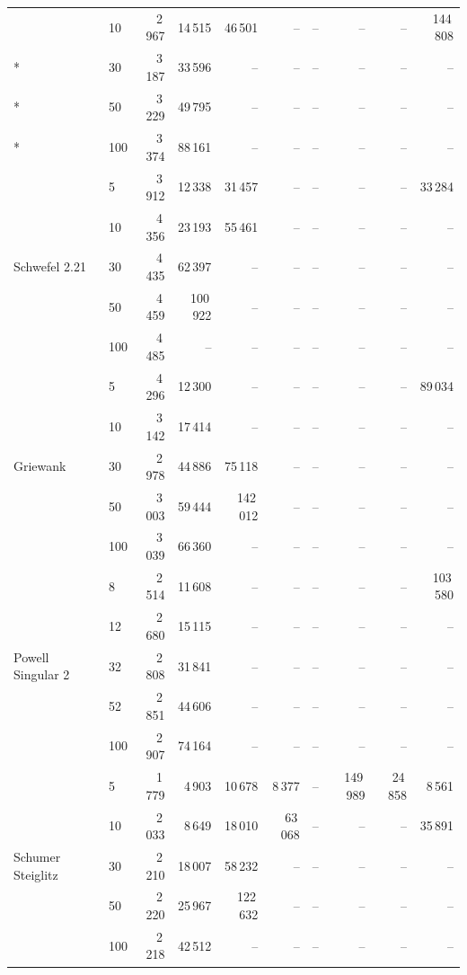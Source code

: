 {\begin{longtable}{llrrrrrrrr}
 & 10 & 2\,967 & 14\,515 & 46\,501 & -- & -- & -- & -- & 144\,808 \\*
 & 30 & 3\,187 & 33\,596 & -- & -- & -- & -- & -- & -- \\*
 & 50 & 3\,229 & 49\,795 & -- & -- & -- & -- & -- & -- \\*
 & 100 & 3\,374 & 88\,161 & -- & -- & -- & -- & -- & -- \\
\midrule
\multirow{5}{*}{Schwefel 2.21} & 5 & 3\,912 & 12\,338 & 31\,457 & -- & -- & -- & -- & 33\,284 \\*
 & 10 & 4\,356 & 23\,193 & 55\,461 & -- & -- & -- & -- & -- \\*
 & 30 & 4\,435 & 62\,397 & -- & -- & -- & -- & -- & -- \\*
 & 50 & 4\,459 & 100\,922 & -- & -- & -- & -- & -- & -- \\*
 & 100 & 4\,485 & -- & -- & -- & -- & -- & -- & -- \\
\midrule
\multirow{5}{*}{Griewank} & 5 & 4\,296 & 12\,300 & -- & -- & -- & -- & -- & 89\,034 \\*
 & 10 & 3\,142 & 17\,414 & -- & -- & -- & -- & -- & -- \\*
 & 30 & 2\,978 & 44\,886 & 75\,118 & -- & -- & -- & -- & -- \\*
 & 50 & 3\,003 & 59\,444 & 142\,012 & -- & -- & -- & -- & -- \\*
 & 100 & 3\,039 & 66\,360 & -- & -- & -- & -- & -- & -- \\
\midrule
\multirow{5}{*}{Powell Singular 2} & 8 & 2\,514 & 11\,608 & -- & -- & -- & -- & -- & 103\,580 \\*
 & 12 & 2\,680 & 15\,115 & -- & -- & -- & -- & -- & -- \\*
 & 32 & 2\,808 & 31\,841 & -- & -- & -- & -- & -- & -- \\*
 & 52 & 2\,851 & 44\,606 & -- & -- & -- & -- & -- & -- \\*
 & 100 & 2\,907 & 74\,164 & -- & -- & -- & -- & -- & -- \\
\midrule
\multirow{5}{*}{Schumer Steiglitz} & 5 & 1\,779 & 4\,903 & 10\,678 & 8\,377 & -- & 149\,989 & 24\,858 & 8\,561 \\*
 & 10 & 2\,033 & 8\,649 & 18\,010 & 63\,068 & -- & -- & -- & 35\,891 \\*
 & 30 & 2\,210 & 18\,007 & 58\,232 & -- & -- & -- & -- & -- \\*
 & 50 & 2\,220 & 25\,967 & 122\,632 & -- & -- & -- & -- & -- \\*
 & 100 & 2\,218 & 42\,512 & -- & -- & -- & -- & -- & -- \\

\end{longtable}}
